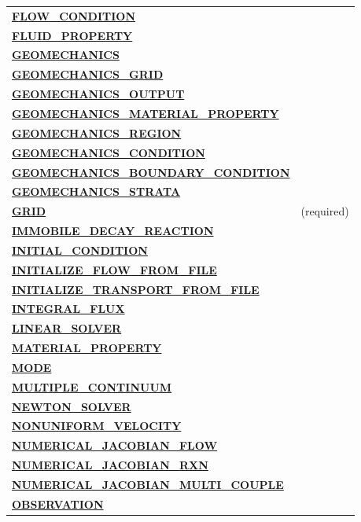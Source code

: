 \begin{longtable}{ll}
\hyperlink{target_flow_cond}{\bf FLOW\_CONDITION} & \\
\hyperlink{target_fluid_property}{\bf FLUID\_PROPERTY} & \\
\hyperlink{target_geomech}{\bf GEOMECHANICS} & \\
\hyperlink{target_geomech_grid}{\bf GEOMECHANICS\_GRID} & \\
\hyperlink{target_geomech_output}{\bf GEOMECHANICS\_OUTPUT} & \\
\hyperlink{target_geomech_material_prop}{\bf GEOMECHANICS\_MATERIAL\_PROPERTY} & \\
\hyperlink{target_geomech_region}{\bf GEOMECHANICS\_REGION} & \\
\hyperlink{target_geomech_condition}{\bf GEOMECHANICS\_CONDITION} & \\
\hyperlink{target_geomech_bc}{\bf GEOMECHANICS\_BOUNDARY\_CONDITION} & \\
\hyperlink{target_geomech_strata}{\bf GEOMECHANICS\_STRATA} & \\
\hyperlink{target_grid}{\bf GRID} & (required)\\
\hyperlink{target_immob}{\bf IMMOBILE\_DECAY\_REACTION} & \\
\hyperlink{target_init}{\bf INITIAL\_CONDITION} & \\
\hyperlink{target_init_flow}{\bf INITIALIZE\_FLOW\_FROM\_FILE} & \\
\hyperlink{target_init_trans}{\bf INITIALIZE\_TRANSPORT\_FROM\_FILE} & \\
\hyperlink{target_int_flux}{\bf INTEGRAL\_FLUX} & \\
\hyperlink{target_linsolv}{\bf LINEAR\_SOLVER} & \\
\hyperlink{target_mat}{\bf MATERIAL\_PROPERTY} & \\
\hyperlink{target_mode}{\bf MODE} & \\
\hyperlink{target_mc}{\bf MULTIPLE\_CONTINUUM} & \\
\hyperlink{target_newt}{\bf NEWTON\_SOLVER} & \\
\hyperlink{target_nonuniform_vel}{\bf NONUNIFORM\_VELOCITY} & \\ 
\hyperlink{target_numjac_flow}{\bf NUMERICAL\_JACOBIAN\_FLOW} & \\
\hyperlink{target_numjac_rxn}{\bf NUMERICAL\_JACOBIAN\_RXN} & \\
\hyperlink{target_numjac_multi}{\bf NUMERICAL\_JACOBIAN\_MULTI\_COUPLE} & \\
\hyperlink{target_observation}{\bf OBSERVATION} & \\

\end{longtable}
